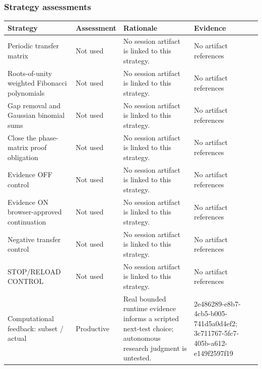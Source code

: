\documentclass[11pt]{article}
\begin{document}
\subsubsection*{Strategy assessments}
\begin{longtable}{>{\raggedright\arraybackslash}p{.16\linewidth}>{\raggedright\arraybackslash}p{.15\linewidth}>{\raggedright\arraybackslash}p{.40\linewidth}>{\raggedright\arraybackslash}p{.17\linewidth}}
\toprule Strategy & Assessment & Rationale & Evidence \\
\midrule\endhead
Periodic transfer matrix & Not used & No session artifact is linked to this strategy. & No artifact references \\
Roots-of-unity weighted Fibonacci polynomials & Not used & No session artifact is linked to this strategy. & No artifact references \\
Gap removal and Gaussian binomial sums & Not used & No session artifact is linked to this strategy. & No artifact references \\
Close the phase-matrix proof obligation & Not used & No session artifact is linked to this strategy. & No artifact references \\
Evidence OFF control & Not used & No session artifact is linked to this strategy. & No artifact references \\
Evidence ON browser-approved continuation & Not used & No session artifact is linked to this strategy. & No artifact references \\
Negative transfer control & Not used & No session artifact is linked to this strategy. & No artifact references \\
STOP/RELOAD CONTROL & Not used & No session artifact is linked to this strategy. & No artifact references \\
Computational feedback: subset / actual & Productive & Real bounded runtime evidence informs a scripted next-test choice; autonomous research judgment is untested. & 2e486289-e8b7-4cb5-b005-741d5a0d4ef2; 3c711767-5fc7-405b-a612-e149f2597f19 \\
\bottomrule
\end{longtable}
\end{document}

